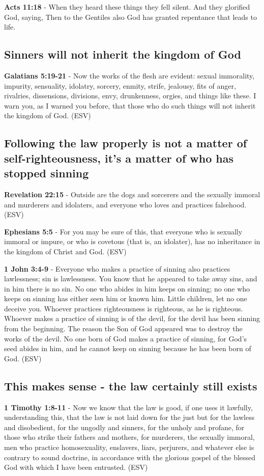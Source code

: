 \documentclass[11pt]{article}
\begin{document}
\textbf{Acts 11:18} - When they heard these things they fell silent. And they glorified God, saying, Then to the Gentiles also God has granted repentance that leads to life.

\subsection{Sinners will not inherit the kingdom of God}
\label{sec:orga1c0f3e}
\textbf{Galatians 5:19-21} -  Now the works of the flesh are evident: sexual immorality, impurity, sensuality, idolatry, sorcery, enmity, strife, jealousy, fits of anger, rivalries, dissensions, divisions, envy, drunkenness, orgies, and things like these.  I warn you, as I warned you before, that those who do such things will not inherit the kingdom of God.  (ESV)

\subsection{Following the law properly is not a matter of self-righteousness, it's a matter of who has stopped sinning}
\label{sec:orgef0f129}
\textbf{Revelation 22:15} -  Outside are the dogs and sorcerers and the sexually immoral and murderers and idolaters, and everyone who loves and practices falsehood.  (ESV)

\textbf{Ephesians 5:5} -  For you may be sure of this, that everyone who is sexually immoral or impure, or who is covetous (that is, an idolater), has no inheritance in the kingdom of Christ and God.  (ESV)

\textbf{1 John 3:4-9} -  Everyone who makes a practice of sinning also practices lawlessness; sin is lawlessness.  You know that he appeared to take away sins, and in him there is no sin.  No one who abides in him keeps on sinning; no one who keeps on sinning has either seen him or known him.  Little children, let no one deceive you.  Whoever practices righteousness is righteous, as he is righteous.  Whoever makes a practice of sinning is of the devil, for the devil has been sinning from the beginning.  The reason the Son of God appeared was to destroy the works of the devil.  No one born of God makes a practice of sinning, for God's seed abides in him, and he cannot keep on sinning because he has been born of God.  (ESV)

\subsection{This makes sense - the law certainly still exists}
\label{sec:org3f91059}
\textbf{1 Timothy 1:8-11} -  Now we know that the law is good, if one uses it lawfully, understanding this, that the law is not laid down for the just but for the lawless and disobedient, for the ungodly and sinners, for the unholy and profane, for those who strike their fathers and mothers, for murderers, the sexually immoral, men who practice homosexuality, enslavers, liars, perjurers, and whatever else is contrary to sound doctrine, in accordance with the glorious gospel of the blessed God with which I have been entrusted.  (ESV)
\end{document}
